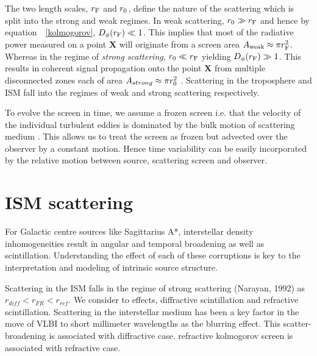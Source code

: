 The two length scales, $r_{\rm F}$ and $r_{\rm 0}$, define the nature of the scattering which is split into the strong and weak regimes. In weak scattering, $ r_{\rm 0} \gg r_{\rm F}$ and hence by equation\ ~\ref{kolmogorov}, $D_{\phi}(r_{\rm F}) \ll 1$. This implies that most of the radiative power measured on a point $\mathbf{X}$ will originate from a screen area $A_{\rm weak} \approx \pi r_{\rm F}^2$. Whereas in the regime of \emph{strong scattering}, $ r_{\rm 0} \ll r_{\rm F}$ yielding  $D_{\phi}(r_{\rm F}) \gg 1$. This  results in coherent signal propagation onto the point $\mathbf{X}$ from multiple disconnected zones each of area $A_{strong} \approx \pi r_{\rm 0}^2$ \citep{Narayan_1992}. Scattering in the troposphere and ISM fall into the regimes of weak and strong scattering respectively.


To evolve the screen in time, we assume a frozen screen i.e. that the velocity of the individual turbulent eddies is dominated by the bulk motion of scattering medium \citep[e.g.][]{Lay_1997}. This allows us to treat the screen as frozen but advected over the observer by a constant motion. Hence time variability can be easily incorporated by the relative motion between source, scattering screen and observer.


\section{ISM scattering}

 For Galactic centre sources like Sagittarius A*, interstellar density inhomogeneities result in angular and temporal broadening as well as scintillation. Understanding the effect of each of these corruptions is key to the interpretation and modeling of intrinsic source structure. 

Scattering in the ISM falls in the regime of strong scattering (Narayan, 1992) as $r_{diff} < r_{FR} < r_{ref} $. We consider to effects, diffractive scintillation and refractive scintillation. Scattering in the interstellar medium has been a key factor in the move of VLBI to short millimeter wavelengths as the blurring effect. This scatter-broadening is associated with diffractive case. 
refractive kolmogorov screen is associated with refractive case. 




